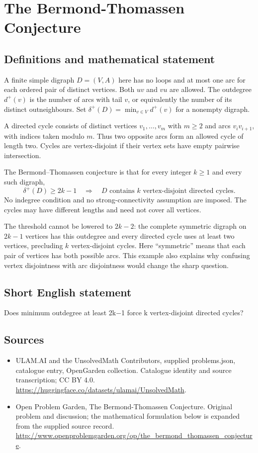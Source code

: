 \documentclass[11pt,a4paper]{article}
\begin{document}
\section*{The Bermond-Thomassen Conjecture}\label{statement}

\subsection{Definitions and mathematical statement}
A finite simple digraph $D=(V,A)$ here has no loops and at most one arc
for each ordered pair of distinct vertices. Both $uv$ and $vu$ are
allowed. The outdegree $d^+(v)$ is the number of arcs with tail $v$, or
equivalently the number of its distinct outneighbours. Set
$\delta^+(D)=\min_{v\in V}d^+(v)$ for a nonempty digraph.

A directed cycle consists of distinct vertices $v_1,\ldots,v_m$ with
$m\ge2$ and arcs $v_iv_{i+1}$, with indices taken modulo $m$. Thus two
opposite arcs form an allowed cycle of length two. Cycles are
vertex-disjoint if their vertex sets have empty pairwise intersection.

The Bermond--Thomassen conjecture is that for every integer $k\ge1$ and
every such digraph,
\[
         \delta^+(D)\ge2k-1
        \quad\Longrightarrow\quad
        D\text{ contains }k\text{ vertex-disjoint directed cycles}.
\]
No indegree condition and no strong-connectivity assumption are imposed.
The cycles may have different lengths and need not cover all vertices.

The threshold cannot be lowered to $2k-2$: the complete symmetric
digraph on $2k-1$ vertices has this outdegree and every directed cycle
uses at least two vertices, precluding $k$ vertex-disjoint cycles.
Here ``symmetric'' means that each pair of vertices has both possible
arcs. This example also explains why confusing vertex disjointness with
arc disjointness would change the sharp question.
\subsection{Short English statement}
Does minimum outdegree at least 2k−1 force k vertex-disjoint directed cycles?
\subsection{Sources}
\begin{itemize}
\item[S1] ULAM.AI and the UnsolvedMath Contributors, supplied problems.json, catalogue entry, OpenGarden collection. Catalogue identity and source transcription; CC BY 4.0.
\url{https://huggingface.co/datasets/ulamai/UnsolvedMath}.
\item[S2] Open Problem Garden, The Bermond-Thomassen Conjecture. Original problem and discussion; the mathematical formulation below is expanded from the supplied source record.
\url{http://www.openproblemgarden.org/op/the_bermond_thomassen_conjecture}.
\end{itemize}
\end{document}
